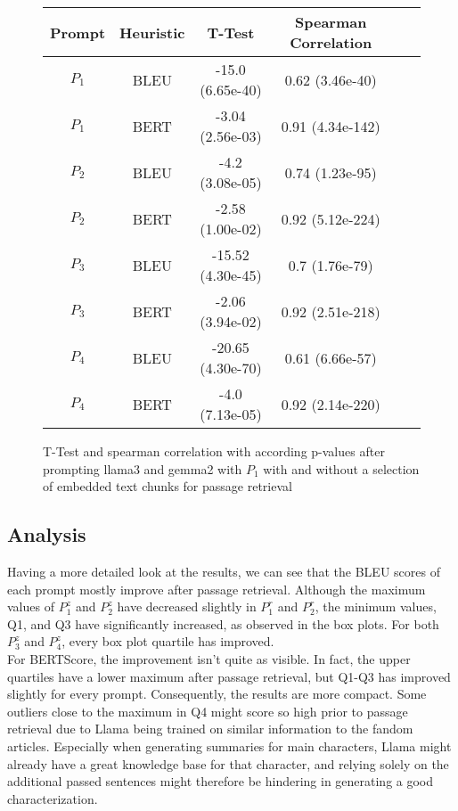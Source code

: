 \begin{figure}[H]
    \begin{center}
        \begin{tabular}{|c|c||c|c|c|c|}
            \hline
            Prompt  & Heuristic & T-Test            & Spearman Correlation \\ [0.5ex]
            \hline\hline
            $P_{1}$ & BLEU      & -15.0 (6.65e-40)  & 0.62 (3.46e-40)      \\
            $P_{1}$ & BERT      & -3.04 (2.56e-03)  & 0.91 (4.34e-142)     \\
            $P_{2}$ & BLEU      & -4.2 (3.08e-05)   & 0.74 (1.23e-95)      \\
            $P_{2}$ & BERT      & -2.58 (1.00e-02)  & 0.92 (5.12e-224)     \\
            $P_{3}$ & BLEU      & -15.52 (4.30e-45) & 0.7 (1.76e-79)       \\
            $P_{3}$ & BERT      & -2.06 (3.94e-02)  & 0.92 (2.51e-218)     \\
            $P_{4}$ & BLEU      & -20.65 (4.30e-70) & 0.61 (6.66e-57)      \\
            $P_{4}$ & BERT      & -4.0 (7.13e-05)   & 0.92 (2.14e-220)     \\
            \hline\hline
        \end{tabular}
    \end{center}
    \label{fig:prompts2}
    \caption{T-Test and spearman correlation with according p-values after prompting llama3 and gemma2 with $P_{1}$ with and without a selection of embedded text chunks for passage retrieval}
\end{figure}



\subsection{Analysis}
Having a more detailed look at the results, we can see that the BLEU scores of each prompt mostly improve after passage retrieval. Although the maximum values of $P_{1}^{z}$ and $P_{2}^{z}$ have decreased slightly in $P_{1}^{r}$ and $P_{2}^{r}$, the minimum values, Q1, and Q3 have significantly increased, as observed in the box plots. For both $P_{3}^{z}$ and $P_{4}^{z}$, every box plot quartile has improved.\\

For BERTScore, the improvement isn't quite as visible. In fact, the upper quartiles have a lower maximum after passage retrieval, but Q1-Q3 has improved slightly for every prompt. Consequently, the results are more compact. Some outliers close to the maximum in Q4 might score so high prior to passage retrieval due to Llama being trained on similar information to the fandom articles. Especially when generating summaries for main characters, Llama might already have a great knowledge base for that character, and relying solely on the additional passed sentences might therefore be hindering in generating a good characterization.\\

